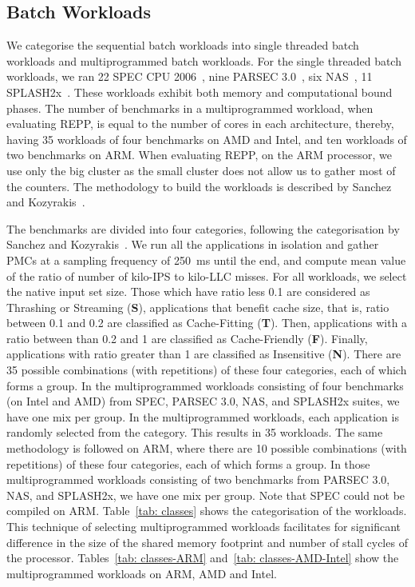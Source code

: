 \subsection{Batch Workloads} 
\label{subsection: batch workloads}

We categorise the sequential batch workloads into single threaded batch workloads and
multiprogrammed batch workloads. For the single threaded batch workloads, we ran 22 SPEC
CPU 2006~\citep{2006core2,Henning2006SPECDescriptions}, nine PARSEC
3.0~\citep{bienia:2008:pbs:1454115.1454128}, six
NAS~\citep{Bailey:1991:NPB:125826.125925}, 11 SPLASH2x~\citep{524546}.  These workloads
exhibit both memory and computational bound phases.  The number of benchmarks in a
multiprogrammed workload, when evaluating REPP, is equal to the number of cores in each
architecture, thereby, having 35 workloads of four benchmarks on AMD and Intel, and ten
workloads of two benchmarks on ARM. When evaluating REPP, on the ARM processor, we use
only the big cluster as the small cluster does not allow us to gather most of the
counters. The methodology to build the workloads is described by Sanchez and
Kozyrakis~\citep{Sanchez:2011:VSE:2000064.2000073}.

The benchmarks are divided into four categories, following the categorisation by Sanchez
and Kozyrakis~\citep{Sanchez:2011:VSE:2000064.2000073}. We run all the applications in
isolation and gather PMCs at a sampling frequency of \SI{250}{\milli\second} until the
end, and compute mean value of the ratio of number of kilo-IPS to kilo-LLC misses. For
all workloads, we select the native input set size.  Those which have  ratio less 0.1 are
considered as Thrashing or Streaming (\textbf{S}), applications that benefit cache size,
that is, ratio between 0.1 and 0.2 are classified as Cache-Fitting (\textbf{T}).  Then,
applications with a ratio between than 0.2 and 1 are classified as Cache-Friendly
(\textbf{F}). Finally, applications with ratio greater than 1 are classified as
Insensitive (\textbf{N}). There are 35 possible combinations (with repetitions) of these
four categories, each of which forms a group. In the multiprogrammed workloads consisting
of four benchmarks (on Intel and AMD) from SPEC, PARSEC 3.0, NAS, and SPLASH2x suites, we
have one mix per group.  In the multiprogrammed workloads, each application is randomly
selected from the category.  This results in 35 workloads.  The same methodology is
followed on ARM, where there are 10 possible combinations (with repetitions) of these four
categories, each of which forms a group. In those multiprogrammed workloads consisting of
two benchmarks from PARSEC 3.0, NAS, and SPLASH2x, we have one mix per group. Note that
SPEC could not be compiled on ARM.  Table~\ref{tab: classes} shows the categorisation of
the workloads.  This technique of selecting multiprogrammed workloads facilitates for
significant difference in the size of the shared memory footprint and number of stall
cycles of the processor. Tables~\ref{tab: classes-ARM} and~\ref{tab: classes-AMD-Intel}
show the multiprogrammed workloads on ARM, AMD and Intel.  

